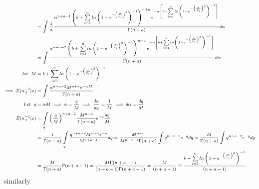 \documentclass[a4paper,12pt]{report}
\begin{document}
\begin{equation}\label{psta}\footnotesize
\begin{split}
&=\int \frac{1}{\alpha}\frac{\alpha^{n+a-1}\left(b+\sum\limits_{ i=1 }^{n}ln\left(1-e^{-\left(\frac{\sigma}{x_i}\right)^2}\right)^{-1}\right)^{n+a} e^{-\alpha \left[b+\sum\limits_{ i=1 }^{n}ln\left(1-e^{-\left(\frac{\sigma}{x_i}\right)^2}\right)^{-1}\right]}}{\Gamma(n+a)}d\alpha\\
&=\int \frac{\alpha^{n+a-2}\left(b+\sum\limits_{ i=1 }^{n}ln\left(1-e^{-\left(\frac{\sigma}{x_i}\right)^2}\right)^{-1}\right)^{n+a} e^{-\alpha \left[b+\sum\limits_{ i=1 }^{n}ln\left(1-e^{-\left(\frac{\sigma}{x_i}\right)^2}\right)^{-1}\right]}}{\Gamma(n+a)}d\alpha\\
let \ \ M &=b+\sum\limits_{ i=1 }^{n}ln\left(1-e^{-\left(\frac{\sigma}{x_i}\right)^2}\right)^{-1}\\
\implies E(\alpha_J^{-1}|x) &= \int \frac{\alpha^{n+a-2}M^{n+a}e^{-\alpha M}}{\Gamma(n+a)}\\
Let\ \ q&=\alpha M\implies\alpha=\dfrac{q}{M}\implies\dfrac{d\alpha}{dq}=\dfrac{1}{M}\implies d\alpha=\dfrac{dq}{M}\\
E(\alpha_J^{-1}|x)&=\int\limits_{q}\left(\frac{q}{M}\right)^{n+a-2}\frac{M^{n+a}}{\Gamma(n+a)}e^{-q}\frac{dq}{M}\\
&=\frac{1}{\Gamma(n+a)}\int\limits_{q}\frac{q^{n+a-2}M^{n+a}e^{-q}}{M^{n+a-1}}dq=\frac{M^{n+a}}{M^{n+a-1}\Gamma(n+a)}\int q^{n+a-2}e^{-q}dq=\frac{M}{\Gamma(n+a)}\int q^{n+a-2}e^{-q}dq\\
&=\frac{M}{\Gamma(n+a)}\Gamma(n+a-1)= \frac{M \Gamma(n+a-1)}{(n+a-1)\Gamma(n+a-1)}=\frac{M }{(n+a-1)}\equiv\frac{b+\sum\limits_{ i=1 }^{n}ln\left(1-e^{-\left(\frac{\sigma}{x_i}\right)^2}\right)^{-1}}{(n+a-1)}
\end{split}
\end{equation}
similarly
\end{document}
